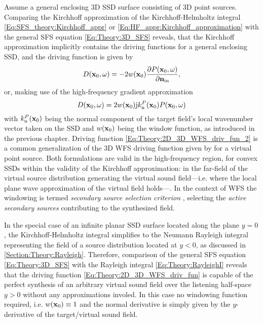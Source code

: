 Assume a general enclosing 3D SSD surface consisting of 3D point sources.
Comparing the Kirchhoff approximation of the Kirchhoff-Helmholtz integral \eqref{Eq:SFS_theory:Kirchhoff_appr} or \eqref{Eq:HF_appr:Kirchhoff_approximation} with the general SFS equation \eqref{Eq:Theory:3D_SFS} reveals, that the Kirchhoff approximation implicitly contains the driving functions for a general enclosing SSD, and the driving function is given by
\begin{equation}
D(\mathbf{x}_0,\omega) = - 2w(\mathbf{x}_0)\frac{\partial P(\mathbf{x}_0,\omega)}{\partial \mathbf{n}_{\mathrm{in}}}, 
\label{Eq:Theory:2D_3D_WFS_driv_fun}
\end{equation}
or, making use of the high-frequency gradient approximation
\begin{equation}
D(\mathbf{x}_0,\omega) = 2 w(\mathbf{x}_0) \mathrm{j} k_{\mathrm{n}}^P(\mathbf{x}_0) P(\mathbf{x}_0,\omega)
\label{Eq:Theory:2D_3D_WFS_driv_fun_2}
\end{equation}
with $k_{\mathrm{n}}^P(\mathbf{x}_0)$ being the normal component of the target field's local wavenumber vector taken on the SSD and $w(\mathbf{x}_0)$ being the window function, as introduced in the previous chapter.
Driving function \eqref{Eq:Theory:2D_3D_WFS_driv_fun_2} is a common generalization of the 3D WFS driving function given by \cite[Eq. 20.]{Zotter2013:uniqueness} for a virtual point source.
Both formulations are valid in the high-frequency region, for convex SSDs within the validity of the Kirchhoff approximation: in the far-field of the virtual source distribution generating the virtual sound field---i.e. where the local plane wave approximation of the virtual field holds---. %
In the context of WFS the windowing is termed \emph{secondary source selection criterion} \cite{Spors2007, Spors2007:DAGA:SS_selection_criterion}, selecting the \emph{active secondary sources} contributing to the synthesized field. 

\vspace{3mm}
In the special case of an infinite planar SSD surface located along the plane $y = 0$, the Kirchhoff-Helmholtz integral simplifies to the Neumann Rayleigh integral representing the field of a source distribution located at $y<0$, as discussed in \ref{Section:Theory:Rayleigh}.
Therefore, comparison of the general SFS equation \eqref{Eq:Theory:3D_SFS} with the Rayleigh integral \eqref{Eq:Theory:RayleighI} reveals that the driving function \eqref{Eq:Theory:2D_3D_WFS_driv_fun} is capable of the perfect synthesis of an arbitrary virtual sound field over the listening half-space $y>0$ without any approximations involed.
In this case no windowing function required, i.e. $w(\mathbf{x}_0) \equiv 1$ and the normal derivative is simply given by the $y$-derivative of the target/virtual sound field.

